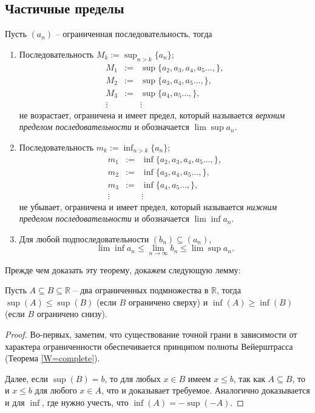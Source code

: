 \subsection{Частичные пределы}


\begin{theorem}\label{from_bounded_sequence}
    Пусть $(a_n)$ -- ограниченная последовательность, тогда
    \begin{enumerate}
        \item Последовательность $M_k:=\sup_{n>k}\{a_n\}$;
        \[
         \begin{matrix}
             M_1 & := & \sup \{a_2, a_3, a_4,a_5 \ldots,\},\\
             M_2 & := & \sup \{a_3, a_4,a_5 \ldots,\},\\
             M_3 & := & \sup \{a_4,a_5 \ldots,\},\\
             \vdots && \vdots
         \end{matrix}
        \]
        не возрастает, ограничена и имеет предел, который называется \textit{верхним пределом последовательности} и обозначается $\lim \sup a_n$.

        \item Последовательность $m_k:=\inf_{n>k}\{a_n\}$;
         \[
         \begin{matrix}
             m_1 & := & \inf \{a_2, a_3, a_4,a_5 \ldots,\},\\
             m_2 & := & \inf \{a_3, a_4,a_5 \ldots,\},\\
             m_3 & := & \inf \{ a_4,a_5 \ldots,\},\\
             \vdots && \vdots
         \end{matrix}
        \]
        не убывает, ограничена и имеет предел, который называется \textit{нижним пределом последовательности} и обозначается $\lim \inf a_n$.

        \item Для любой подпоследовательности $ (b_n ) \subseteq  (a_n )$, 
        \[
         \lim \inf a_n \le \lim_{n \to \infty } b_n \le \lim \sup a_n.
        \]

    \end{enumerate}
\end{theorem}

Прежде чем доказать эту теорему, докажем следующую лемму:

\begin{lemma}\label{A<B=sup(A)<sup(B)}
    Пусть $A \subseteq B \subseteq \mathbb{R}$ -- два ограниченных подмножества в $\mathbb{R}$, тогда $\sup(A) \le \sup(B)$ (если $B$ ограничено сверху) и $\inf(A) \ge \inf(B)$ (если $B$ ограничено снизу). 
\end{lemma}
\begin{proof}
    Во-первых, заметим, что существование точной грани в зависимости от характера ограниченности обеспечивается принципом полноты Вейерштрасса (Теорема \ref{W=complete}). 

    Далее, если $\sup(B) = b$, то для любых $x \in B$ имеем $x \le b$, так как $A \subseteq B$, то и $x \le b$ для любого $x \in A$, что и доказывает требуемое. Аналогично доказывается и для $\inf$, где нужно учесть, что $\inf(A) = -\sup (-A)$.
\end{proof}

